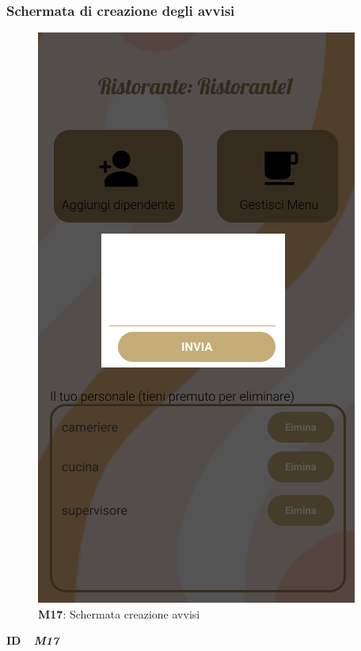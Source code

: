                   \subsubsection{Schermata di creazione degli avvisi}
                      \begin{figure}[H]
                        \centering
                        \includegraphics[scale=0.5]{assets/diagrammi/Mockup/Mockup_SaveAdv.png}
                        \caption*{\textbf{M17}: Schermata creazione avvisi}\label{fig:Mockup_SaveAdv}
                      \end{figure}
            
                      \begin{flushleft}
                        \textbf{ID}   \ \Large{ \emph{\textbf{M17}}}
                      \end{flushleft}
            
